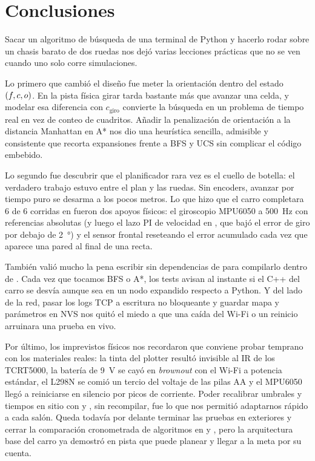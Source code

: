 \section{Conclusiones}
\label{sec:conclusiones}

Sacar un algoritmo de búsqueda de una terminal de Python y hacerlo rodar sobre un chasis barato de dos ruedas nos dejó varias lecciones prácticas que no se ven cuando uno solo corre simulaciones.

Lo primero que cambió el diseño fue meter la orientación dentro del estado $(f,c,o)$. En la pista física girar tarda bastante más que avanzar una celda, y modelar esa diferencia con $c_{\text{giro}}$ convierte la búsqueda en un problema de tiempo real en vez de conteo de cuadritos. Añadir la penalización de orientación a la distancia Manhattan en A* nos dio una heurística sencilla, admisible y consistente que recorta expansiones frente a BFS y UCS sin complicar el código embebido.

Lo segundo fue descubrir que el planificador rara vez es el cuello de botella: el verdadero trabajo estuvo entre el plan y las ruedas. Sin encoders, avanzar por tiempo puro se desarma a los pocos metros. Lo que hizo que el carro completara 6 de 6 corridas en  fueron dos apoyos físicos: el giroscopio MPU6050 a \SI{500}{\hertz} con referencias absolutas (y luego el lazo PI de velocidad en , que bajó el error de giro por debajo de \SI{2}{\degree}) y el sensor frontal reseteando el error acumulado cada vez que aparece una pared al final de una recta.

También valió mucho la pena escribir  sin dependencias de  para compilarlo dentro de . Cada vez que tocamos BFS o A*, los tests avisan al instante si el C++ del carro se desvía aunque sea en un nodo expandido respecto a Python. Y del lado de la red, pasar los logs TCP a escritura no bloqueante y guardar mapa y parámetros en NVS nos quitó el miedo a que una caída del Wi-Fi o un reinicio arruinara una prueba en vivo.

Por último, los imprevistos físicos nos recordaron que conviene probar temprano con los materiales reales: la tinta del plotter resultó invisible al IR de los TCRT5000, la batería de \SI{9}{\volt} se cayó en \emph{brownout} con el Wi-Fi a potencia estándar, el L298N se comió un tercio del voltaje de las pilas AA y el MPU6050 llegó a reiniciarse en silencio por picos de corriente. Poder recalibrar umbrales y tiempos en sitio con  y , sin recompilar, fue lo que nos permitió adaptarnos rápido a cada salón. Queda todavía por delante terminar las pruebas en exteriores y cerrar la comparación cronometrada de algoritmos en  y , pero la arquitectura base del carro ya demostró en pista que puede planear y llegar a la meta por su cuenta.
